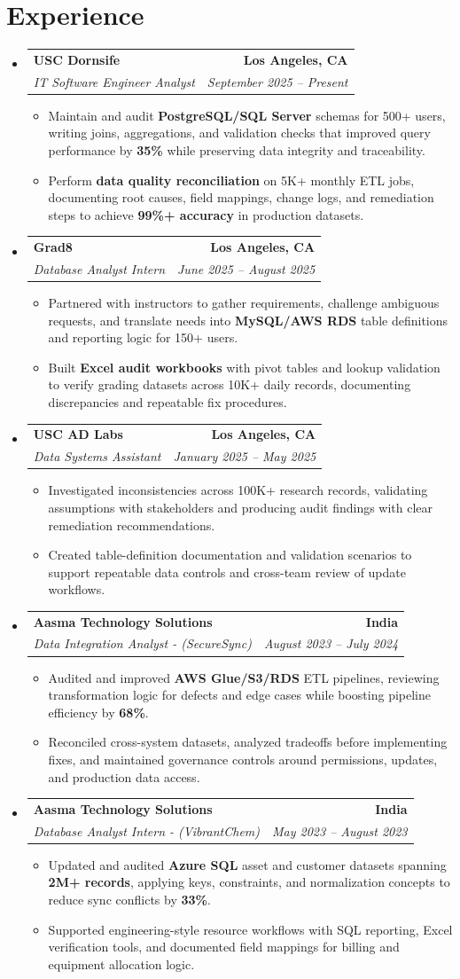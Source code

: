 \documentclass[letterpaper,10pt]{article}
\makeatletter
\newcommand{\resumeItem}[1]{\item\small{{#1 \vspace{-2pt}}}}
\newcommand{\resumeSubheading}[4]{\vspace{-1pt}\item\begin{tabular*}{1.0\textwidth}[t]{l@{\extracolsep{\fill}}r}\textbf{#1} & \textbf{\small #2} \\\textit{\small#3} & \textit{\small #4} \\\end{tabular*}\vspace{-2pt}}
\newcommand{\resumeSubHeadingListStart}{\begin{itemize}[leftmargin=0.0in, label={}]}
\newcommand{\resumeSubHeadingListEnd}{\end{itemize}}
\newcommand{\resumeItemListStart}{\begin{itemize}[leftmargin=0.15in,label=\textbullet,itemsep=2pt,topsep=0pt,parsep=0pt,partopsep=0pt]}
\newcommand{\resumeItemListEnd}{\end{itemize}\vspace{-4pt}}
\makeatother
\begin{document}
\section{Experience}
\resumeSubHeadingListStart
\resumeSubheading{USC Dornsife}{Los Angeles, CA}{IT Software Engineer Analyst}{September 2025 -- Present}
\resumeItemListStart
\resumeItem{Maintain and audit \textbf{PostgreSQL/SQL Server} schemas for 500+ users, writing joins, aggregations, and validation checks that improved query performance by \textbf{35\%} while preserving data integrity and traceability.}
\resumeItem{Perform \textbf{data quality reconciliation} on 5K+ monthly ETL jobs, documenting root causes, field mappings, change logs, and remediation steps to achieve \textbf{99\%+ accuracy} in production datasets.}
\resumeItemListEnd
\resumeSubheading{Grad8}{Los Angeles, CA}{Database Analyst Intern}{June 2025 -- August 2025}
\resumeItemListStart
\resumeItem{Partnered with instructors to gather requirements, challenge ambiguous requests, and translate needs into \textbf{MySQL/AWS RDS} table definitions and reporting logic for 150+ users.}
\resumeItem{Built \textbf{Excel audit workbooks} with pivot tables and lookup validation to verify grading datasets across 10K+ daily records, documenting discrepancies and repeatable fix procedures.}
\resumeItemListEnd
\resumeSubheading{USC AD Labs}{Los Angeles, CA}{Data Systems Assistant}{January 2025 -- May 2025}
\resumeItemListStart
\resumeItem{Investigated inconsistencies across 100K+ research records, validating assumptions with stakeholders and producing audit findings with clear remediation recommendations.}
\resumeItem{Created table-definition documentation and validation scenarios to support repeatable data controls and cross-team review of update workflows.}
\resumeItemListEnd
\resumeSubheading{Aasma Technology Solutions}{India}{Data Integration Analyst - (SecureSync)}{August 2023 -- July 2024}
\resumeItemListStart
\resumeItem{Audited and improved \textbf{AWS Glue/S3/RDS} ETL pipelines, reviewing transformation logic for defects and edge cases while boosting pipeline efficiency by \textbf{68\%}.}
\resumeItem{Reconciled cross-system datasets, analyzed tradeoffs before implementing fixes, and maintained governance controls around permissions, updates, and production data access.}
\resumeItemListEnd
\resumeSubheading{Aasma Technology Solutions}{India}{Database Analyst Intern - (VibrantChem)}{May 2023 -- August 2023}
\resumeItemListStart
\resumeItem{Updated and audited \textbf{Azure SQL} asset and customer datasets spanning \textbf{2M+ records}, applying keys, constraints, and normalization concepts to reduce sync conflicts by \textbf{33\%}.}
\resumeItem{Supported engineering-style resource workflows with SQL reporting, Excel verification tools, and documented field mappings for billing and equipment allocation logic.}
\resumeItemListEnd
\resumeSubHeadingListEnd
\vspace{-14pt}
\end{document}
